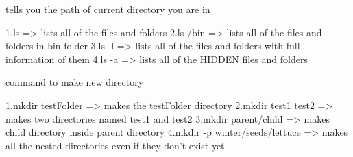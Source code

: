 
tells you the path of current directory you are in


1.ls => lists all of the files and folders
2.ls /bin => lists all of the files and folders in bin folder
3.ls -l =>  lists all of the files and folders with full information of them
4.ls -a => lists all of the HIDDEN files and folders


command to make new directory

1.mkdir testFolder => makes the testFolder directory
2.mkdir test1 test2 => makes two directories named test1 and test2 
3.mkdir parent/child => makes child directory inside parent directory 
4.mkdir -p winter/seeds/lettuce => makes all the nested directories even if they don't exist yet


